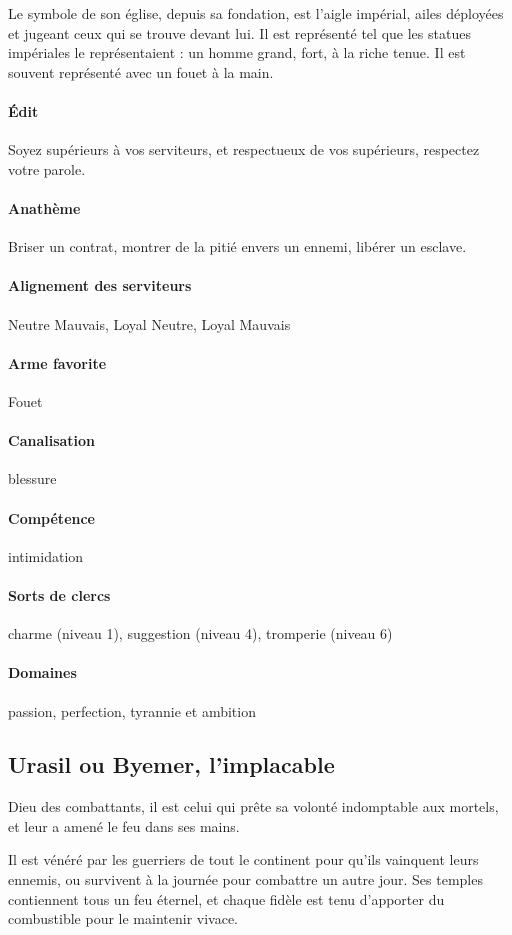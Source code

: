 \documentclass[10pt,a4paper]{book}
\begin{document}
Le symbole de son église, depuis sa fondation, est l'aigle impérial, ailes déployées et jugeant ceux qui se trouve devant lui. Il est représenté tel que les statues impériales le représentaient : un homme grand, fort, à la riche tenue. Il est souvent représenté avec un fouet à la main.
\paragraph{Édit} Soyez supérieurs à vos serviteurs, et respectueux de vos supérieurs, respectez votre parole.
\paragraph{Anathème} Briser un contrat, montrer de la pitié envers un ennemi, libérer un esclave. 
\paragraph{Alignement des serviteurs}Neutre Mauvais, Loyal Neutre, Loyal Mauvais
\paragraph{Arme favorite } Fouet
\paragraph{Canalisation} blessure
\paragraph{Compétence}intimidation
\paragraph{Sorts de clercs}charme (niveau 1), suggestion (niveau 4), tromperie (niveau 6)
\paragraph{Domaines }passion, perfection, tyrannie et ambition
\subsection{Urasil ou Byemer, l'implacable}
Dieu des combattants, il est celui qui prête sa volonté indomptable aux mortels, et leur a amené le feu dans ses mains.

Il est vénéré par les guerriers de tout le continent pour qu'ils vainquent leurs ennemis, ou survivent à la journée pour combattre un autre jour. Ses temples contiennent tous un feu éternel, et chaque fidèle est tenu d'apporter du combustible pour le maintenir vivace.
\end{document}
